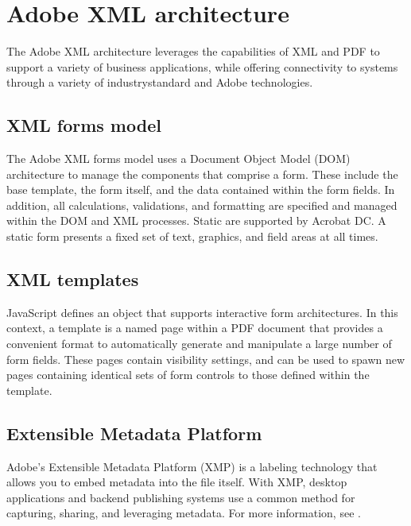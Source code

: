 \documentclass[letterpaper,12pt,english,openany,oneside]{sphinxmanual}
\begin{document}
\section{Adobe XML architecture}
\label{\detokenize{Overview_XML:adobe-xml-architecture}}
The Adobe XML architecture leverages the capabilities of XML and PDF to support a variety of business applications, while offering connectivity to systems through a variety of industry\sphinxhyphen{}standard and Adobe technologies.




\subsection{XML forms model}
\label{\detokenize{Overview_XML:xml-forms-model}}
The Adobe XML forms model uses a Document Object Model (DOM) architecture to manage the components that comprise a form. These include the base template, the form itself, and the data contained within the form fields. In addition, all calculations, validations, and formatting are specified and managed within the DOM and XML processes. Static are supported by Acrobat DC. A static form presents a fixed set of text, graphics, and field areas at all times.


\subsection{XML templates}
\label{\detokenize{Overview_XML:xml-templates}}
JavaScript defines an object that supports interactive form architectures. In this context, a template is a named page within a PDF document that provides a convenient format to automatically generate and manipulate a large number of form fields. These pages contain visibility settings, and can be used to spawn new pages containing identical sets of form controls to those defined within the template.


\subsection{Extensible Metadata Platform}
\label{\detokenize{Overview_XML:extensible-metadata-platform}}
Adobe’s Extensible Metadata Platform (XMP) is a labeling technology that allows you to embed metadata into the file itself. With XMP, desktop applications and back\sphinxhyphen{}end publishing systems use a common method for capturing, sharing, and leveraging metadata. For more information, see .
\end{document}
